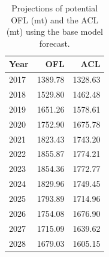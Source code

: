 \documentclass[12pt,]{article}
\begin{document}
\begin{table}[ht]
\centering
\caption{Projections of potential OFL (mt) and the ACL (mt) using the base model forecast.} 
\label{tab:OFL_projection}
\begin{tabular}{lrr}
  \hline
Year & OFL & ACL \\ 
  \hline
2017 & 1389.78 & 1328.63 \\ 
  2018 & 1529.80 & 1462.48 \\ 
  2019 & 1651.26 & 1578.61 \\ 
  2020 & 1752.90 & 1675.78 \\ 
  2021 & 1823.43 & 1743.20 \\ 
  2022 & 1855.87 & 1774.21 \\ 
  2023 & 1854.36 & 1772.77 \\ 
  2024 & 1829.96 & 1749.45 \\ 
  2025 & 1793.89 & 1714.96 \\ 
  2026 & 1754.08 & 1676.90 \\ 
  2027 & 1715.09 & 1639.62 \\ 
  2028 & 1679.03 & 1605.15 \\ 
   \hline
\end{tabular}
\end{table}\begin{table}[ht]
\centering
\caption{Summary of 10-year 
                                             projections beginning in 2019 
                                             for alternate states of nature based on 
                                             an axis of uncertainty for the Base model.  Columns range over low, mid, and high
                                             states of nature, and rows range over different 
                                             assumptions of catch levels. An entry of "--" 
                                             indicates that the stock is driven to very low 
                                             abundance under the particular scenario.} 
\label{tab:Decision_table_mod1}
\end{table}
\end{document}
